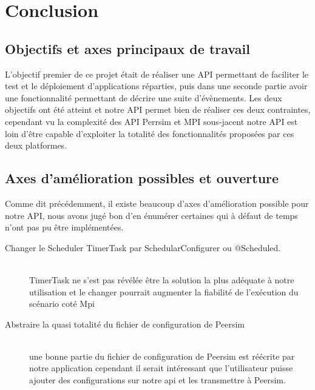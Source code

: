 \documentclass{article}
\begin{document}
		\newpage
		\section{Conclusion}
			\subsection{Objectifs et axes principaux de travail}
			L'objectif premier de ce projet était de réaliser une API permettant de faciliter le test et le déploiement d'applications réparties, puis dans une seconde partie avoir une 
			fonctionnalité permettant de décrire une suite d'évènements. 
			\newline
			Les deux objectifs ont été atteint et notre API permet bien de réaliser ces deux contraintes,
			cependant vu la complexité des API Perrsim et MPI sous-jacent notre API est loin d'être capable d'exploiter la totalité des fonctionnalités proposées par ces deux platformes.
			\subsection{Axes d'amélioration possibles et ouverture}
			Comme dit précédemment, il existe beaucoup d'axes d'amélioration possible pour notre API, nous avons jugé bon d'en énumérer certaines qui à défaut de temps n'ont pas pu être implémentées.

			\begin{description}
				\item[Changer le Scheduler TimerTask par SchedularConfigurer ou @Scheduled.] \hfill \\ TimerTask ne s'est pas révélée être la solution la plus adéquate à notre utilisation et le changer pourrait augmenter la fiabilité de l'exécution du scénario coté Mpi
				\item[Abstraire la quasi totalité du fichier de configuration de Peersim] \hfill \\ une bonne partie du fichier de configuration de Peersim est réécrite par notre application cependant il serait intéressant que l'utilisateur puisse ajouter des configurations sur notre api et les transmettre à Peersim.
			  \end{description}
		

			  \newpage
\end{document}
